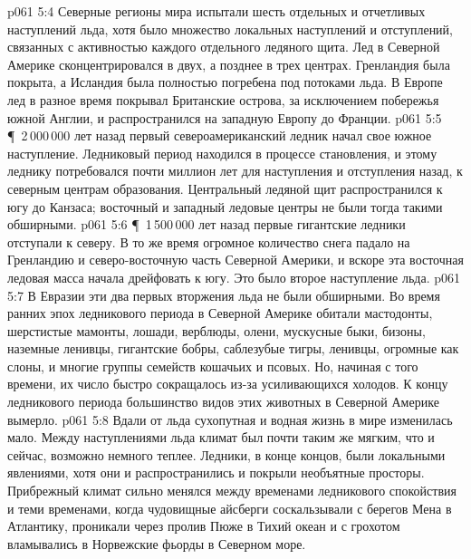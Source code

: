 \vs p061 5:4 Северные регионы мира испытали шесть отдельных и отчетливых наступлений льда, хотя было множество локальных наступлений и отступлений, связанных с активностью каждого отдельного ледяного щита. Лед в Северной Америке сконцентрировался в двух, а позднее в трех центрах. Гренландия была покрыта, а Исландия была полностью погребена под потоками льда. В Европе лед в разное время покрывал Британские острова, за исключением побережья южной Англии, и распространился на западную Европу до Франции.
\vs p061 5:5 \P\ 2\,000\,000 лет назад первый североамериканский ледник начал свое южное наступление. Ледниковый период находился в процессе становления, и этому леднику потребовался почти миллион лет для наступления и отступления назад, к северным центрам образования. Центральный ледяной щит распространился к югу до Канзаса; восточный и западный ледовые центры не были тогда такими обширными.
\vs p061 5:6 \P\ 1\,500\,000 лет назад первые гигантские ледники отступали к северу. В то же время огромное количество снега падало на Гренландию и северо\hyp{}восточную часть Северной Америки, и вскоре эта восточная ледовая масса начала дрейфовать к югу. Это было второе наступление льда.
\vs p061 5:7 В Евразии эти два первых вторжения льда не были обширными. Во время ранних эпох ледникового периода в Северной Америке обитали мастодонты, шерстистые мамонты, лошади, верблюды, олени, мускусные быки, бизоны, наземные ленивцы, гигантские бобры, саблезубые тигры, ленивцы, огромные как слоны, и многие группы семейств кошачьих и псовых. Но, начиная с того времени, их число быстро сокращалось из\hyp{}за усиливающихся холодов. К концу ледникового периода большинство видов этих животных в Северной Америке вымерло.
\vs p061 5:8 Вдали от льда сухопутная и водная жизнь в мире изменилась мало. Между наступлениями льда климат был почти таким же мягким, что и сейчас, возможно немного теплее. Ледники, в конце концов, были локальными явлениями, хотя они и распространились и покрыли необъятные просторы. Прибрежный климат сильно менялся между временами ледникового спокойствия и теми временами, когда чудовищные айсберги соскальзывали с берегов Мена в Атлантику, проникали через пролив Пюже в Тихий океан и с грохотом вламывались в Норвежские фьорды в Северном море.
